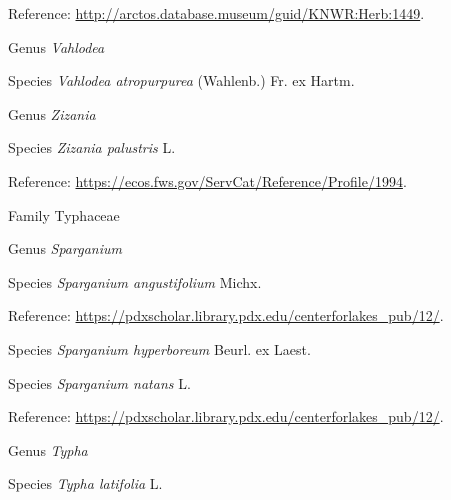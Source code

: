 \documentclass[9pt, article]{memoir}
\begin{document}
\begin{multicols}{2}
\vspace{6pt}Reference: 
\url{http://arctos.database.museum/guid/KNWR:Herb:1449}.

\vspace{6pt}\noindent\hspace{30pt}Genus \textit{Vahlodea}


\vspace{6pt}\noindent\hspace{36pt}Species \textit{Vahlodea atropurpurea} (Wahlenb.) Fr. ex Hartm.


\vspace{6pt}\noindent\hspace{30pt}Genus \textit{Zizania}


\vspace{6pt}\noindent\hspace{36pt}Species \textit{Zizania palustris} L.


\vspace{6pt}Reference: 
\url{https://ecos.fws.gov/ServCat/Reference/Profile/1994}.

\vspace{6pt}\noindent\hspace{24pt}Family Typhaceae


\vspace{6pt}\noindent\hspace{30pt}Genus \textit{Sparganium}


\vspace{6pt}\noindent\hspace{36pt}Species \textit{Sparganium angustifolium} Michx.


\vspace{6pt}Reference: 
\url{https://pdxscholar.library.pdx.edu/centerforlakes_pub/12/}.

\vspace{6pt}\noindent\hspace{36pt}Species \textit{Sparganium hyperboreum} Beurl. ex Laest.


\vspace{6pt}\noindent\hspace{36pt}Species \textit{Sparganium natans} L.


\vspace{6pt}Reference: 
\url{https://pdxscholar.library.pdx.edu/centerforlakes_pub/12/}.

\vspace{6pt}\noindent\hspace{30pt}Genus \textit{Typha}


\vspace{6pt}\noindent\hspace{36pt}Species \textit{Typha latifolia} L.



\end{multicols}
\end{document}
